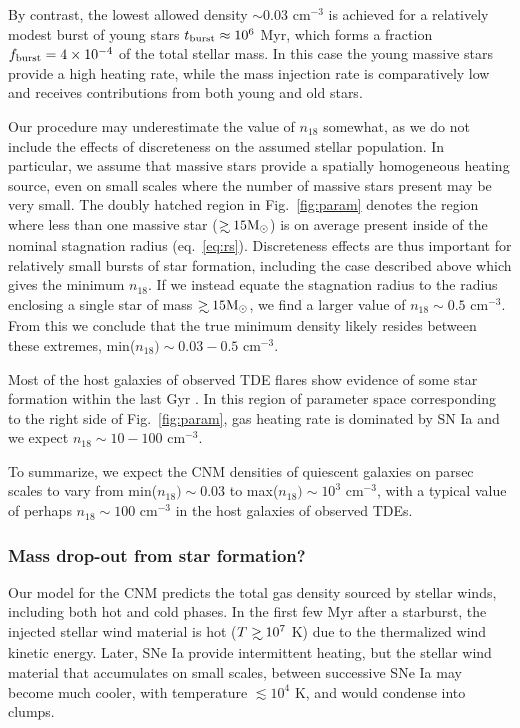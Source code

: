 \documentclass[usenatbib,fleqn]{mnras}
\newcommand\gsim{\mathrel{\rlap{\lower4pt\hbox{\hskip1pt$\sim$}}
    \raise1pt\hbox{$>$}}}
\newcommand{\Msun}{{\rm M_\odot}}
\begin{document}
By contrast, the lowest allowed density $\sim 0.03$ cm$^{-3}$ is
achieved for a relatively modest burst of young stars $t_{\rm burst}
\approx 10^{6}$ Myr, which forms a fraction $f_{\rm burst} = 4\times
10^{-4}$ of the total stellar mass. In this case the young massive
stars provide a high heating rate, while the mass injection rate is
comparatively low and receives contributions from both young and old
stars.

Our procedure may underestimate the value of $n_{18}$ somewhat, as we
do not include the effects of discreteness on the assumed stellar
population.  In particular, we assume that massive stars provide a
spatially homogeneous heating source, even on small scales where the
number of massive stars present may be very small.  The doubly hatched
region in Fig.~\ref{fig:param} denotes the region where less than one
massive star ($\gsim 15 \Msun$) is on average present inside of the
nominal stagnation radius (eq.~\ref{eq:rs}).  Discreteness effects are
thus important for relatively small bursts of star formation,
including the case described above which gives the minimum $n_{18}$.
If we instead equate the stagnation radius to the radius enclosing a
single star of mass $\gsim 15 \Msun$, we find a larger value of
$n_{18}\sim 0.5$ cm$^{-3}$.  From this we conclude that the true
minimum density likely resides between these extremes, min($n_{18})
\sim 0.03-0.5$ cm$^{-3}$.

Most of the host galaxies of observed TDE flares show evidence of some
star formation within the last Gyr \citep{French+2016}.  In this
region of parameter space corresponding to the right side of
Fig.~\ref{fig:param}, gas heating rate is dominated by SN Ia and we
expect $n_{18}\sim 10-100$ cm$^{-3}$.

To summarize, we expect the CNM densities of quiescent galaxies on
parsec scales to vary from min($n_{18}) \sim 0.03$ to max($n_{18})\sim
10^{3}$ cm$^{-3}$, with a typical value of perhaps $n_{18}\sim 100$ cm$^{-3}$
in the host galaxies of observed TDEs.

\subsubsection{Mass drop-out from star formation?}

Our model for the CNM predicts the total gas density sourced by
stellar winds, including both hot and cold phases.  In the first few
Myr after a starburst, the injected stellar wind material is hot
($T\gsim 10^{7}$ K) due to the thermalized wind kinetic energy.
Later, SNe Ia provide intermittent heating, but the stellar wind
material that accumulates on small scales, between successive SNe Ia
may become much cooler, with temperature $\lesssim 10^{4}$ K, and
would condense into clumps.
\end{document}
